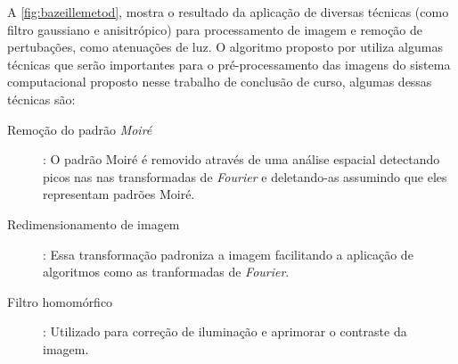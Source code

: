 A \autoref{fig:bazeillemetod}, mostra o resultado da aplicação de diversas técnicas (como filtro gaussiano e anisitrópico) para processamento de imagem e remoção de pertubações, como atenuações de luz.
% 
O algoritmo proposto por \cite{bazeille2006} utiliza algumas técnicas que serão importantes para o pré-processamento das imagens do sistema computacional proposto nesse trabalho de conclusão de curso, algumas dessas técnicas são:

\begin{description}
    \item[Remoção do padrão \textit{Moiré}]: O padrão Moiré é removido através de uma análise espacial detectando picos nas nas transformadas de \textit{Fourier} e deletando-as assumindo que eles representam padrões Moiré.
    
    \item[Redimensionamento de imagem]: Essa transformação padroniza a imagem facilitando a aplicação de algoritmos como as tranformadas de \textit{Fourier}.
    
    \item[Filtro homomórfico]: Utilizado para correção de iluminação e aprimorar o contraste da imagem.
\end{description}
    





